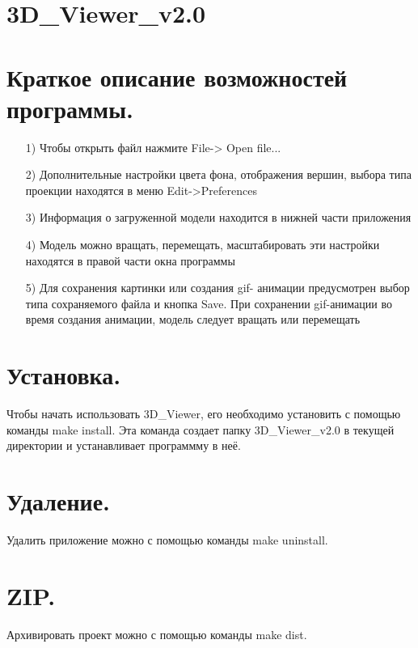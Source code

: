 \documentclass{report}
\begin{document}
\section* {\bfseries 3D\_Viewer\_v2.0}
\section* {\bfseries Краткое описание возможностей программы.}
\begin{itemize}
\item[1)] Чтобы открыть файл нажмите File-> Open file...

\item[2)] Дополнительные настройки цвета фона, отображения вершин,
  выбора типа проекции находятся в меню Edit->Preferences

\item[3)] Информация о загруженной модели находится в нижней
  части приложения

\item[4)] Модель можно вращать, перемещать, масштабировать
  эти настройки находятся в правой части окна программы

\item[5)] Для сохранения картинки или создания gif- анимации
  предусмотрен выбор типа сохраняемого файла и кнопка
  Save. При сохранении gif-анимации во время создания
  анимации, модель следует вращать или перемещать
\end{itemize}
\section* {\bfseries Установка.}

Чтобы начать использовать 3D\_Viewer, его необходимо установить с помощью команды make install. Эта команда создает папку 3D\_Viewer\_v2.0 в текущей директории и устанавливает программму в неё.

\section* {\bfseries Удаление.}

Удалить приложение можно с помощью команды make uninstall.

\section* {\bfseries ZIP.}

Архивировать проект можно с помощью команды make dist.
\end{document}

